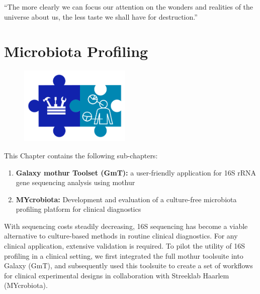 \begin{savequote}[75mm]
“The more clearly we can focus our attention on the wonders and realities of the universe about us, the less taste we shall have for destruction.”
\end{savequote}

\chapter{Microbiota Profiling}\label{chapter:microbiota}
\setcounter{figure}{-1}
\setcounter{table}{-1}
\setcounter{section}{-1}

\begin{figure}[t!]
\includegraphics[height=10em]{frontmatter/images/chapter-header-microbiota-tools.png}
\end{figure}
\setcounter{figure}{-1}
\setcounter{table}{-1}
\setcounter{section}{-1}

This Chapter contains the following sub-chapters:

\begin{enumerate}[label=\ref{chapter:microbiota}.\arabic*]
\itemsep-0.5em
\item \textbf{Galaxy mothur Toolset (GmT):} a user-friendly application for 16S rRNA gene sequencing analysis using mothur
\item \textbf{MYcrobiota:} Development and evaluation of a culture-free microbiota profiling platform for clinical diagnostics
\end{enumerate}


With sequencing costs steadily decreasing, 16S sequencing has become a viable alternative to culture-based methods in routine clinical diagnostics. For any clinical application, extensive validation is required. To pilot the utility of 16S profiling in a clinical setting, we first integrated the full mothur toolsuite into Galaxy (GmT), and subsequently used this toolsuite to create a set of workflows for clinical experimental designs in collaboration with Streeklab Haarlem (MYcrobiota).



